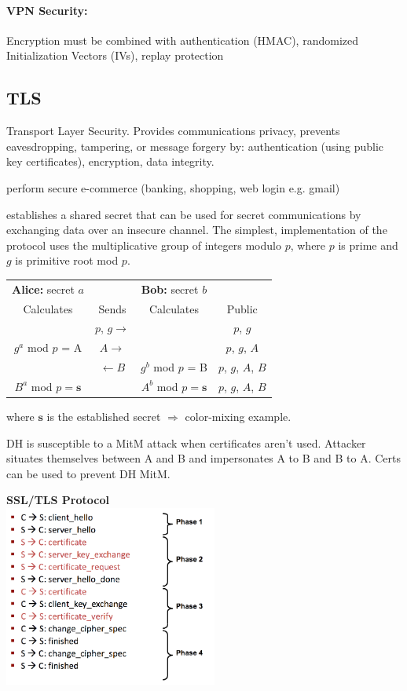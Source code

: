 \paragraph{VPN Security:} Encryption must be combined with authentication (HMAC), randomized Initialization Vectors (IVs), replay protection

\subsection{TLS}

Transport Layer Security. Provides communications privacy, prevents eavesdropping, tampering, or message forgery by: authentication (using public key certificates), encryption, data integrity.

 perform secure e-commerce (banking, shopping, web login e.g. gmail)

 establishes a shared secret that can be used for secret communications by exchanging data over an insecure channel. The simplest,  implementation of the protocol uses the multiplicative group of integers modulo $p$, where $p$ is prime and $g$ is primitive root mod $p$.

\begin{tabular}{ccc|c}
\multicolumn{1}{c}{\textbf{Alice:} secret $a$} & &  \multicolumn{1}{c}{\textbf{Bob:} secret $b$} & \\
Calculates & Sends & Calculates & Public \\
\hline
\hline
 & $p$, $g\to$ & & $p$, $g$ \\
$g^a$ mod $p$ = A & $A\to$ & & $p$, $g$, $A$ \\
 & $\leftarrow B$ &$g^b$ mod $p$ = B & $p$, $g$, $A$, $B$ \\
 $B^a$ mod $p = \mathbf{s}$ & & $A^b$ mod $p = \mathbf{s}$ & $p$, $g$, $A$, $B$ \\
\end{tabular}

where $\mathbf{s}$ is the established secret $\Rightarrow$ color-mixing example.

 DH is susceptible to a MitM attack when certificates aren't used. Attacker situates themselves between A and B and impersonates A to B and B to A. Certs can be used to prevent DH MitM.

\textbf{SSL/TLS Protocol}\\
\includegraphics[width=7cm]{images/SSLProtocol}

